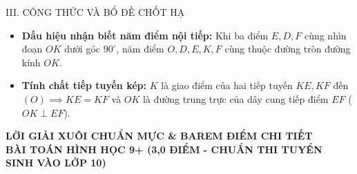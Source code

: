 \documentclass[11pt,a4paper]{article}
\begin{document}
\vspace{1mm}

\begin{formulabox}{III. CÔNG THỨC VÀ BỔ ĐỀ CHỐT HẠ}
\begin{itemize}[leftmargin=*, nosep]
    \item \textbf{Dấu hiệu nhận biết năm điểm nội tiếp:} Khi ba điểm $E, D, F$ cùng nhìn đoạn $OK$ dưới góc $90^\circ$, năm điểm $O, D, E, K, F$ cùng thuộc đường tròn đường kính $OK$.
    \item \textbf{Tính chất tiếp tuyến kép:} $K$ là giao điểm của hai tiếp tuyến $KE, KF$ đến $(O) \implies KE = KF$ và $OK$ là đường trung trực của dây cung tiếp điểm $EF$ ($OK \perp EF$).
\end{itemize}
\end{formulabox}

\newpage

\begin{center}
    {\Large\bfseries\color{blue!80!black} LỜI GIẢI XUÔI CHUẨN MỰC \& BAREM ĐIỂM CHI TIẾT}\\[1.5mm]
    {\large\bfseries BÀI TOÁN HÌNH HỌC 9+ (3,0 ĐIỂM - CHUẨN THI TUYỂN SINH VÀO LỚP 10)}
\end{center}

\vspace{1mm}
\end{document}
